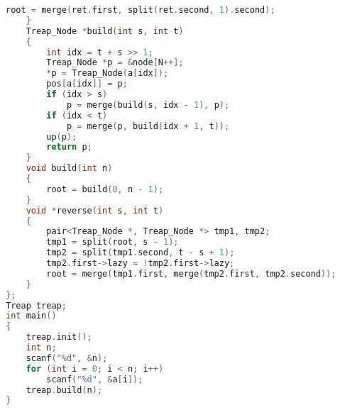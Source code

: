 \begin{lstlisting}[language=c++]
		root = merge(ret.first, split(ret.second, 1).second);
	}
	Treap_Node *build(int s, int t)
	{
		int idx = t + s >> 1;
		Treap_Node *p = &node[N++];
		*p = Treap_Node(a[idx]);
		pos[a[idx]] = p;
		if (idx > s)
			p = merge(build(s, idx - 1), p);
		if (idx < t)
			p = merge(p, build(idx + 1, t));
		up(p);
		return p;
	}
	void build(int n)
	{
		root = build(0, n - 1);
	}
	void *reverse(int s, int t)
	{
		pair<Treap_Node *, Treap_Node *> tmp1, tmp2;
		tmp1 = split(root, s - 1);
		tmp2 = split(tmp1.second, t - s + 1);
		tmp2.first->lazy = !tmp2.first->lazy;
		root = merge(tmp1.first, merge(tmp2.first, tmp2.second));
	}
};
Treap treap;
int main()
{
	treap.init();
	int n;
	scanf("%d", &n);
	for (int i = 0; i < n; i++)
		scanf("%d", &a[i]);
	treap.build(n);
}
	\end{lstlisting}